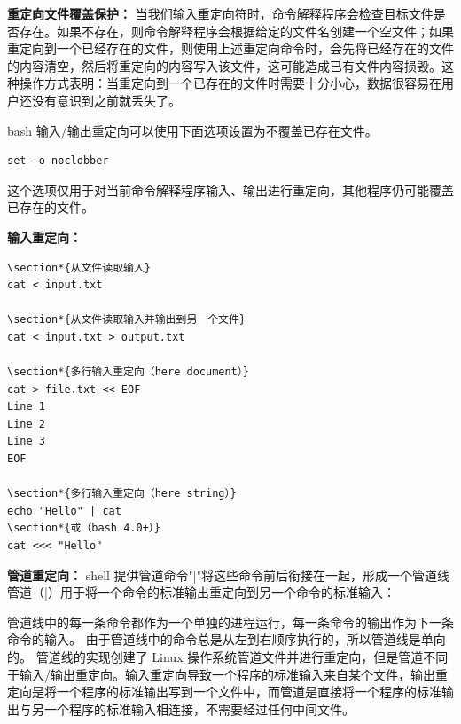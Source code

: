 \documentclass[12pt,UTF8]{ctexbook}
\begin{document}
\textbf{重定向文件覆盖保护：}
当我们输入重定向符时，命令解释程序会检查目标文件是否存在。如果不存在，则命令解释程序会根据给定的文件名创建一个空文件；如果重定向到一个已经存在的文件，则使用上述重定向命令时，会先将已经存在的文件的内容清空，然后将重定向的内容写入该文件，这可能造成已有文件内容损毁。这种操作方式表明：当重定向到一个已存在的文件时需要十分小心，数据很容易在用户还没有意识到之前就丢失了。

bash 输入/输出重定向可以使用下面选项设置为不覆盖已存在文件。
\begin{verbatim}
set -o noclobber
\end{verbatim}

这个选项仅用于对当前命令解释程序输入、输出进行重定向，其他程序仍可能覆盖已存在的文件。

\textbf{输入重定向：}
\begin{verbatim}
\section*{从文件读取输入}
cat < input.txt

\section*{从文件读取输入并输出到另一个文件}
cat < input.txt > output.txt

\section*{多行输入重定向（here document）}
cat > file.txt << EOF
Line 1
Line 2
Line 3
EOF

\section*{多行输入重定向（here string）}
echo "Hello" | cat
\section*{或（bash 4.0+）}
cat <<< "Hello"
\end{verbatim}

\textbf{管道重定向：}
shell 提供管道命令"|"将这些命令前后衔接在一起，形成一个管道线
管道（|）用于将一个命令的标准输出重定向到另一个命令的标准输入：

管道线中的每一条命令都作为一个单独的进程运行，每一条命令的输出作为下一条命令的输入。
由于管道线中的命令总是从左到右顺序执行的，所以管道线是单向的。
管道线的实现创建了 Linux 操作系统管道文件并进行重定向，但是管道不同于输入/输出重定向。输入重定向导致一个程序的标准输入来自某个文件，输出重定向是将一个程序的标准输出写到一个文件中，而管道是直接将一个程序的标准输出与另一个程序的标准输入相连接，不需要经过任何中间文件。
\end{document}
